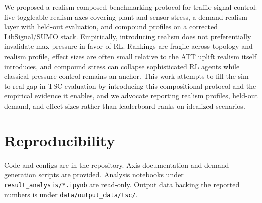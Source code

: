 \documentclass[conference]{IEEEtran}
\begin{document}
We proposed a realism-composed benchmarking protocol for traffic signal control: five toggleable realism axes covering plant and sensor stress, a demand-realism layer with held-out evaluation, and compound profiles on a corrected LibSignal/SUMO stack. Empirically, introducing realism does not preferentially invalidate max-pressure in favor of RL. Rankings are fragile across topology and realism profile, effect sizes are often small relative to the ATT uplift realism itself introduces, and compound stress can collapse sophisticated RL agents while classical pressure control remains an anchor. This work attempts to fill the sim-to-real gap in TSC evaluation by introducing this compositional protocol and the empirical evidence it enables, and we advocate reporting realism profiles, held-out demand, and effect sizes rather than leaderboard ranks on idealized scenarios.

\section*{Reproducibility}

Code and configs are in the repository. Axis documentation and demand generation scripts are provided. Analysis notebooks under \texttt{result\_analysis/*.ipynb} are read-only. Output data backing the reported numbers is under \texttt{data/output\_data/tsc/}.



\end{document}
